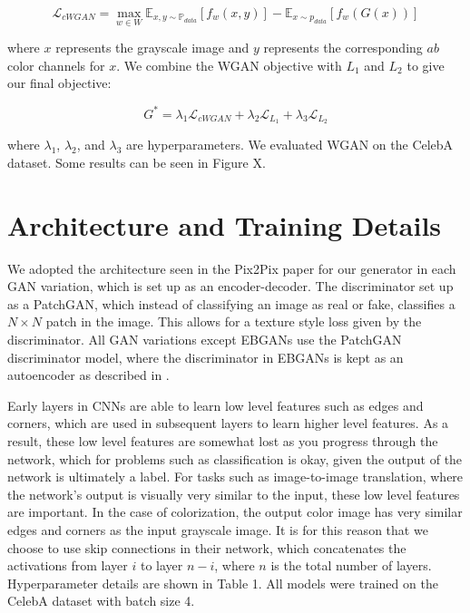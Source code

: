 \documentclass[10pt]{article}
\begin{document}
\[\mathcal{L}_{cWGAN} = \max\limits_{w \in W} \mathbb{E}_{x,y \sim \mathbb{P}_{data}}[f_w(x,y)] -
\mathbb{E}_{x \sim p_{data}}[f_w(G(x))]\]

\noindent where $x$ represents the grayscale image and $y$ represents the corresponding
$ab$ color channels for $x$. We combine the WGAN objective with $L_1$ and $L_2$ to give our final objective:

\[ G^* = \lambda_1 \mathcal{L}_{cWGAN} + \lambda_2 \mathcal{L}_{L_1} + \lambda_3 \mathcal{L}_{L_2} \]

\noindent where $\lambda_1$, $\lambda_2$, and $\lambda_3$ are hyperparameters. We evaluated WGAN on
the CelebA dataset. Some results can be seen in Figure X. 

\section{Architecture and Training Details}
We adopted the architecture seen in the Pix2Pix paper \cite{isola2016image} for our generator in each GAN variation, which is set up as an encoder-decoder. The 
discriminator set up as a PatchGAN, which instead of classifying an image as real or fake, classifies a $N \times N$ patch in the image. This allows for a texture style loss given
by the discriminator. All GAN variations except EBGANs use the PatchGAN discriminator model, where the discriminator in EBGANs is kept as an autoencoder as described in \cite{zhao2016energy}.

Early layers in CNNs are able to learn low level features such as edges and corners, which are used in subsequent layers to learn higher level features. As a result, these low level features are
somewhat lost as you progress through the network, which for problems such as classification is okay, given the output of the network is ultimately a label. For tasks such as
image-to-image translation, where the network's output is visually very similar to the input, these low level features are important. In the case of colorization, the
output color image has very similar edges and corners as the input grayscale image. It is for this reason that we choose to use skip connections in their network, which concatenates the
activations from layer $i$ to layer $n-i$, where $n$ is the total number of layers. Hyperparameter details are shown in Table 1. All models were trained on the CelebA dataset with batch size 4.
\end{document}
